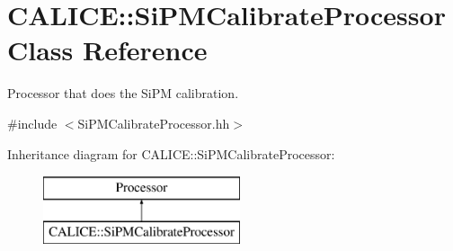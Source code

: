 \section{C\-A\-L\-I\-C\-E\-:\-:Si\-P\-M\-Calibrate\-Processor Class Reference}
\label{classCALICE_1_1SiPMCalibrateProcessor}


Processor that does the Si\-P\-M calibration.  




{\ttfamily \#include $<$Si\-P\-M\-Calibrate\-Processor.\-hh$>$}

Inheritance diagram for C\-A\-L\-I\-C\-E\-:\-:Si\-P\-M\-Calibrate\-Processor\-:\begin{figure}[H]
\begin{center}
\leavevmode
\includegraphics[height=2.000000cm]{classCALICE_1_1SiPMCalibrateProcessor}
\end{center}
\end{figure}
